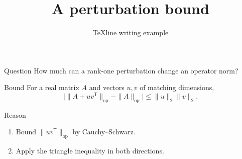 \documentclass{beamer}
\title{A perturbation bound}
\author{TeXline writing example}
\date{}
\begin{document}
\begin{frame}{Question}
How much can a rank-one perturbation change an operator norm?
\end{frame}
\begin{frame}{Bound}
For a real matrix $A$ and vectors $u,v$ of matching dimensions,
\[
 \big|\|A+uv^{\mathsf T}\|_{\mathrm{op}}-\|A\|_{\mathrm{op}}\big|
 \leq \|u\|_2\|v\|_2.
\]
\end{frame}
\begin{frame}{Reason}
\begin{enumerate}
\item Bound $\|uv^{\mathsf T}\|_{\mathrm{op}}$ by Cauchy--Schwarz.
\item Apply the triangle inequality in both directions.
\end{enumerate}
\end{frame}
\end{document}
